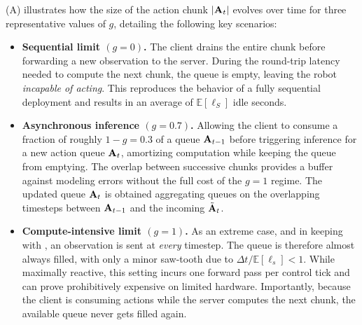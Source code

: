 (A) illustrates how the size of the action chunk \(\lvert \mathbf{A}_t \rvert\) evolves over time for three representative values of \(g\), detailing the following key scenarios:
\begin{itemize}
    \item \textbf{Sequential limit \((g=0)\).} The client drains the entire chunk before forwarding a new observation to the server. During the round-trip latency needed to compute the next chunk, the queue is empty, leaving the robot \emph{incapable of acting}.  This reproduces the behavior of a fully sequential deployment and results in an average of \( \mathbb E[\ell_S] \) idle seconds.
    \item \textbf{Asynchronous inference \((g=0.7)\).} Allowing the client to consume a fraction of roughly \(1-g = 0.3\) of a queue \( \mathbf{A}_{t-1}\) before triggering inference for a new action queue \( \mathbf{A}_{t} \), amortizing computation while keeping the queue from emptying. The overlap between successive chunks provides a buffer against modeling errors without the full cost of the \(g=1\) regime. The updated queue \( \mathbf{A}_t\) is obtained aggregating queues on the overlapping timesteps between \( \mathbf{A}_{t-1}\) and the incoming \(\tilde{\mathbf{A}}_{t}\).
    \item \textbf{Compute-intensive limit \((g=1)\).}  As an extreme case, and in keeping with \citet{zhao2023learningact, chi2024diffusionpolicy}, an observation is sent at \emph{every} timestep. The queue is therefore almost always filled, with only a minor saw-tooth due to \(\Delta t/\mathbb E[\ell_s] < 1\). While maximally reactive, this setting incurs one forward pass per control tick and can prove prohibitively expensive on limited hardware. Importantly, because the client is consuming actions while the server computes the next chunk, the available queue never gets filled again.
\end{itemize}

